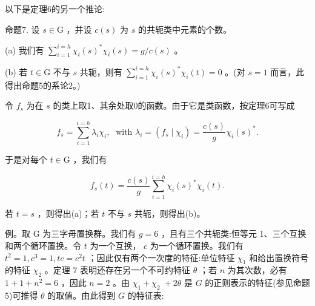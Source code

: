 \documentclass[10pt]{article}
\begin{document}
以下是定理6的另一个推论:

命题7. 设 \(s \in  \mathrm{G}\) ，并设 \(c\left( s\right)\) 为 \(s\) 的共轭类中元素的个数。

(a) 我们有 \(\mathop{\sum }\limits_{{i = 1}}^{{i = h}}{\chi }_{i}{\left( s\right) }^{ * }{\chi }_{i}\left( s\right)  = g/c\left( s\right)\) 。

(b) 若 \(t \in  \mathrm{G}\) 不与 \(s\) 共轭，则有 \(\mathop{\sum }\limits_{{i = 1}}^{{i = h}}{\chi }_{i}{\left( s\right) }^{ * }{\chi }_{i}\left( t\right)  = 0\) 。(对 \(s = 1\) 而言，此得出命题5的系论2。)

令 \({f}_{s}\) 为在 \(s\) 的类上取1、其余处取0的函数。由于它是类函数，按定理6可写成

\[
{f}_{s} = \mathop{\sum }\limits_{{i = 1}}^{{i = h}}{\lambda }_{i}{\chi }_{i},\;\text{ with }{\lambda }_{i} = \left( {{f}_{s} \mid  {\chi }_{i}}\right)  = \frac{c\left( s\right) }{g}{\chi }_{i}{\left( s\right) }^{ * }.
\]

于是对每个 \(t \in  \mathrm{G}\) ，我们有

\[
{f}_{s}\left( t\right)  = \frac{c\left( s\right) }{g}\mathop{\sum }\limits_{{i = 1}}^{{i = h}}{\chi }_{i}{\left( s\right) }^{ * }{\chi }_{i}\left( t\right) .
\]

若 \(t = s\) ，则得出(a)；若 \(t\) 不与 \(s\) 共轭，则得出(b)。

例。取 \(\mathrm{G}\) 为三字母置换群。我们有 \(g = 6\) ，且有三个共轭类:恒等元 1、三个互换和两个循环置换。令 \(t\) 为一个互换， \(c\) 为一个循环置换。我们有 \({t}^{2} = 1,{c}^{3} = 1,{tc} = {c}^{2}t\) ；因此仅有两个一次度的特征:单位特征 \({\chi }_{1}\) 和给出置换符号的特征 \({\chi }_{2}\) 。定理 7 表明还存在另一个不可约特征 \(\theta\) ；若 \(n\) 为其次数，必有 \(1 + 1 + {n}^{2} = 6\) ，因此 \(n = 2\) 。由 \({\chi }_{1} + {\chi }_{2} \; + {2\theta }\) 是 \(G\) 的正则表示的特征(参见命题 5)可推得 \(\theta\) 的取值。由此得到 \(G\) 的特征表:

\begin{center}
\end{center}
\end{document}
